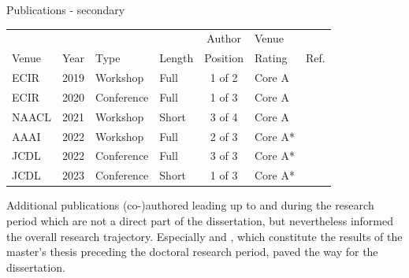 \documentclass[en,16:9,smallfoot]{sdqbeamer}
\begin{document}
   \begin{frame}{Publications - secondary}
    \begin{table}
    \centering
      \begin{tabular}{llllclr}
        \hline
        \ & \ & \ & \ & Author & Venue & \ \\
        Venue & Year & Type & Length & Position & Rating & Ref. \\
        \hline
        ECIR & 2019 & Workshop & Full & 1 of 2 & Core A & \cite{Saier2019} \\
        ECIR & 2020 & Conference & Full & 1 of 3 & Core A & \cite{Saier2020a} \\
        NAACL & 2021 & Workshop & Short & 3 of 4 & Core A & \cite{Krause2021} \\
        AAAI & 2022 & Workshop & Full & 2 of 3 & Core A* & \cite{Shapiro2022} \\
        JCDL & 2022 & Conference & Full & 3 of 3 & Core A* & \cite{Nishioka2022} \\
        JCDL & 2023 & Conference & Short & 1 of 3 & Core A* & \cite{Saier2023cocon} \\
        \hline
        \end{tabular}
    \end{table}

    Additional publications (co-)authored leading up to and during the research period which are not a direct part of the dissertation, but nevertheless informed the overall research trajectory. Especially \cite{Saier2019} and \cite{Krause2021}, which constitute the results of the master's thesis preceding the doctoral research period, paved the way for the dissertation.
   \end{frame}
\end{document}
